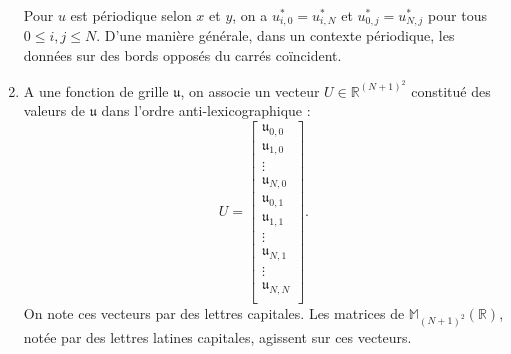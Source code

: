 \begin{enumerate}
Pour $u$ est périodique selon $x$ et $y$, on a $u^*_{i,0}=u^*_{i,N}$ et $u^*_{0,j}=u^*_{N,j}$ pour tous $0 \leq i,j \leq N$.
D'une manière générale, dans un contexte périodique, les données sur des bords opposés du carrés coïncident.

\item A une fonction de grille $\mathfrak{u}$, on associe un vecteur $U \in \mathbb{R}^{(N+1)^2}$ constitué des valeurs de $\mathfrak{u}$ dans l'ordre anti-lexicographique :
\begin{equation}
U = \begin{bmatrix}
\mathfrak{u}_{0,0}\\
\mathfrak{u}_{1,0}\\
\vdots \\
\mathfrak{u}_{N,0}\\
\mathfrak{u}_{0,1}\\
\mathfrak{u}_{1,1}\\
\vdots \\
\mathfrak{u}_{N,1}\\
\vdots \\
\mathfrak{u}_{N,N}\\
\end{bmatrix}.
\end{equation}
On note ces vecteurs par des lettres capitales. Les matrices de $\mathbb{M}_{(N+1)^2} (\mathbb{R})$, notée par des lettres latines capitales, agissent sur ces vecteurs.
\end{enumerate}

